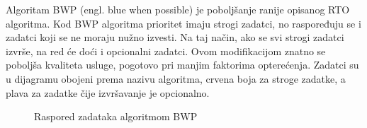 \documentclass[../zavrsni.tex]{subfiles}
\begin{document}
Algoritam BWP (engl. blue when possible) je poboljšanje ranije opisanog RTO algoritma. Kod BWP algoritma prioritet imaju strogi zadatci, 
no raspoređuju se i zadatci koji se ne moraju nužno izvesti. Na taj način, ako se svi strogi zadatci izvrše, na red će doći
i opcionalni zadatci. Ovom modifikacijom znatno se poboljša kvaliteta usluge, pogotovo pri
 manjim faktorima opterećenja. Zadatci su u dijagramu obojeni prema nazivu algoritma, crvena boja za stroge zadatke, a plava za zadatke 
 čije izvršavanje je opcionalno. 

 \begin{figure}[h!]
    \centering

    \begin{RTGrid}[width=13cm]{3}{24}

    
  
    
  
    

    \end{RTGrid}

    \caption{Raspored zadataka algoritmom BWP}
    \label{fig:ex1}
  \end{figure}
\end{document}

